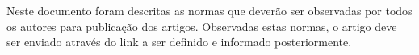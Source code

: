 \documentclass[../main.tex]{subfiles}
\begin{document}
  Neste documento foram descritas as normas que deverão ser observadas por todos os autores para publicação dos artigos. Observadas estas normas, o artigo deve ser enviado através do link a ser definido e informado posteriormente. 
\end{document}
